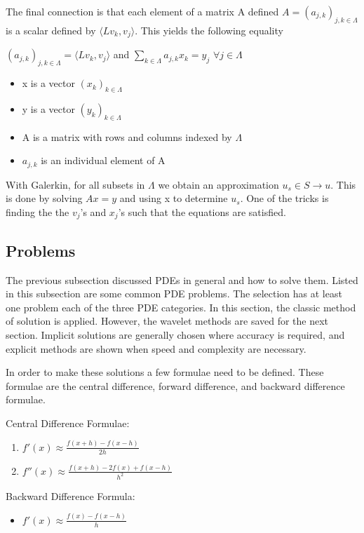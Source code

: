 \documentclass[11pt]{article}
\begin{document}
The final connection is that each element of a matrix A defined $A=(a_{j,k} )_{j,k \in \Lambda}$ is a scalar defined by  $\langle Lv_k , v_j \rangle$.  This yields the following equality

$(a_{j,k} )_{j,k \in \Lambda} = \langle Lv_k , v_j \rangle$ and $\sum_{k\in \Lambda} a_{j,k} x_k = y_j$  $\forall j\in \Lambda$
\begin{itemize}
\item x is a vector $(x_k)_{k\in \Lambda}$
\item y is a vector $(y_k)_{k\in \Lambda}$
\item A is a matrix with rows and columns indexed by $\Lambda$
\item $a_{j,k}$ is an individual element of A

\end{itemize}

With Galerkin, for all subsets in $\Lambda$ we obtain an approximation $u_s \in S \to u$.  This is done by solving $Ax=y$ and using x to determine $u_s$.  One of the tricks is finding the the $v_j$'s and $x_j$'s such that the equations are satisfied.  

\subsection {Problems}
The previous subsection discussed PDEs in general and how to solve them.  Listed in this subsection are some common PDE problems.  The selection has at least one problem each of the three PDE categories.  In this section, the classic method of solution is applied.  However, the wavelet methods are saved for the next section.  Implicit solutions are generally chosen where accuracy is required, and explicit methods are shown when speed and complexity are necessary.  

In order to make these solutions a few formulae need to be defined.  These formulae are the central difference, forward difference, and backward difference formulae. 

Central Difference Formulae:
\begin{enumerate}
\item $f'(x) \approx \frac{f(x+h) - f(x-h)}{2h} $
\item $f''(x) \approx \frac {f(x+h) -2f(x)+ f(x-h)}{h^2}$
\end{enumerate}

Backward Difference Formula: 
\begin{itemize}
\item $f'(x) \approx \frac{f(x) - f(x-h)}{h} $
\end{itemize}
\end{document}
